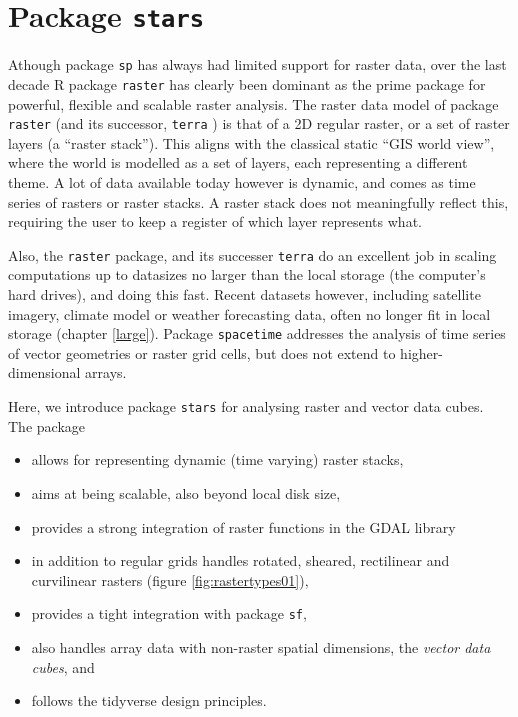 \documentclass[]{book}
\providecommand{\tightlist}{%
  \setlength{\itemsep}{0pt}\setlength{\parskip}{0pt}}
\begin{document}
\hypertarget{package-stars}{%
\section{\texorpdfstring{Package \texttt{stars}}{Package stars}}\label{package-stars}}

Athough package \texttt{sp} has always had limited support for raster data,
over the last decade R package \texttt{raster} \citep{R-raster} has clearly been
dominant as the prime package for powerful, flexible and scalable
raster analysis. The raster data model of package \texttt{raster} (and
its successor, \texttt{terra} \citep{R-terra}) is that of a 2D regular raster,
or a set of raster layers (a ``raster stack''). This aligns with
the classical static ``GIS world view'', where the world is modelled
as a set of layers, each representing a different theme. A lot of
data available today however is dynamic, and comes as time series
of rasters or raster stacks. A raster stack does not meaningfully
reflect this, requiring the user to keep a register of which layer
represents what.

Also, the \texttt{raster} package, and its successer \texttt{terra} do an excellent
job in scaling computations up to datasizes no larger than the local
storage (the computer's hard drives), and doing this fast. Recent
datasets however, including satellite imagery, climate model or
weather forecasting data, often no longer fit in local storage
(chapter \ref{large}). Package \texttt{spacetime} \citep{spacetime2012}
addresses the analysis of time series of vector geometries or raster
grid cells, but does not extend to higher-dimensional arrays.

Here, we introduce package \texttt{stars} for analysing raster and vector
data cubes. The package

\begin{itemize}
\tightlist
\item
  allows for representing dynamic (time varying) raster stacks,
\item
  aims at being scalable, also beyond local disk size,
\item
  provides a strong integration of raster functions in the GDAL
  library
\item
  in addition to regular grids handles rotated, sheared, rectilinear and curvilinear rasters (figure \ref{fig:rastertypes01}),
\item
  provides a tight integration with package \texttt{sf},
\item
  also handles array data with non-raster spatial dimensions, the \emph{vector data cubes}, and
\item
  follows the tidyverse design principles.
\end{itemize}
\end{document}
